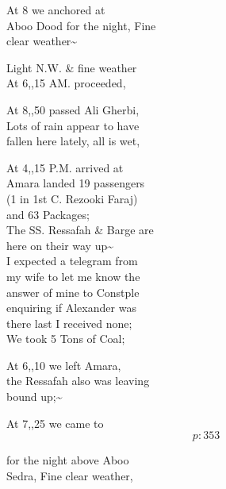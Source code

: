 \documentclass{report}
\begin{document}
	\par{
 	At 8 we anchored at\ \\Aboo Dood for the night, Fine\ \\clear weather\~{}\ \\
	}

	\par{
 	Light N.W. \& fine weather\ \\At 6,,15 AM. proceeded,\ \\
	}

	\par{
 	At 8,,50 passed Ali Gherbi,\ \\Lots of rain appear to have\ \\fallen here lately, all is wet,\ \\
	}

	\par{
 	At 4,,15 P.M. arrived at\ \\Amara landed 19 passengers\ \\(1 in 1st C. Rezooki Faraj)\ \\and 63 Packages;\ \\The SS. Ressafah \& Barge are\ \\here on their way up\~{}\ \\I expected a telegram from\ \\my wife to let me know the\ \\answer of mine to Constple\ \\enquiring if Alexander was\ \\there last I received none;\ \\We took 5 Tons of Coal;\ \\
	}

	\par{
 	At 6,,10 we left Amara,\ \\the Ressafah also was leaving\ \\bound up;\~{}\ \\
	}

	\par{
 	At 7,,25 we came to\ \\
  \[p: 353 \]

	}



	\par{
 	for the night above Aboo\ \\Sedra, Fine clear weather,\ \\
	}
\end{document}
